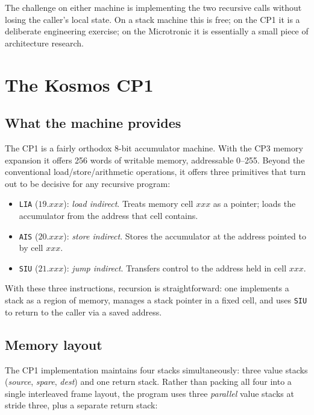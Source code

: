 \documentclass[11pt,a4paper]{article}
\begin{document}
\noindent
The challenge on either machine is implementing the two recursive
calls without losing the caller's local state. On a stack machine
this is free; on the CP1 it is a deliberate engineering exercise; on
the Microtronic it is essentially a small piece of architecture
research.

\section{The Kosmos CP1}

\subsection{What the machine provides}

The CP1 is a fairly orthodox 8-bit accumulator machine. With the CP3
memory expansion it offers 256 words of writable memory, addressable
0--255. Beyond the conventional load/store/arithmetic operations, it
offers three primitives that turn out to be decisive for any
recursive program:

\begin{itemize}
  \item \texttt{LIA} ($19.xxx$): \emph{load indirect}. Treats memory
    cell $xxx$ as a pointer; loads the accumulator from the address
    that cell contains.
  \item \texttt{AIS} ($20.xxx$): \emph{store indirect}. Stores the
    accumulator at the address pointed to by cell $xxx$.
  \item \texttt{SIU} ($21.xxx$): \emph{jump indirect}. Transfers
    control to the address held in cell $xxx$.
\end{itemize}

\noindent
With these three instructions, recursion is straightforward: one
implements a stack as a region of memory, manages a stack pointer in a
fixed cell, and uses \texttt{SIU} to return to the caller via a saved
address.

\subsection{Memory layout}

The CP1 implementation maintains four stacks simultaneously: three
value stacks (\textit{source}, \textit{spare}, \textit{dest}) and one
return stack. Rather than packing all four into a single
interleaved frame layout, the program uses three \emph{parallel} value
stacks at stride three, plus a separate return stack:
\end{document}
